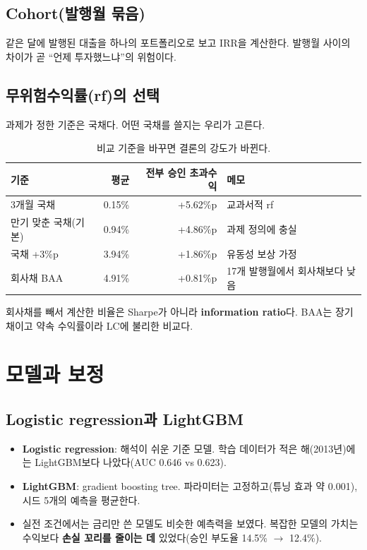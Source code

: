 \documentclass[11pt]{report}
\begin{document}
\section{Cohort(발행월 묶음)}
같은 달에 발행된 대출을 하나의 포트폴리오로 보고 IRR을 계산한다. 발행월 사이의 차이가 곧 ``언제 투자했느냐''의 위험이다.

\section{무위험수익률(rf)의 선택}
과제가 정한 기준은 국채다. 어떤 국채를 쓸지는 우리가 고른다.
\begin{table}[H]\centering\small
\begin{tabularx}{\linewidth}{@{}lrrL@{}}\toprule
기준 & 평균 & 전부 승인 초과수익 & 메모\\\midrule
3개월 국채 & 0.15\% & +5.62\%p & 교과서적 rf\\
만기 맞춘 국채(기본) & 0.94\% & +4.86\%p & 과제 정의에 충실\\
국채 +3\%p & 3.94\% & +1.86\%p & 유동성 보상 가정\\
회사채 BAA & 4.91\% & +0.81\%p & 17개 발행월에서 회사채보다 낮음\\\bottomrule
\end{tabularx}
\caption{비교 기준을 바꾸면 결론의 강도가 바뀐다.}
\end{table}
\begin{warnbox}
회사채를 빼서 계산한 비율은 Sharpe가 아니라 \textbf{information ratio}다. BAA는 장기채이고 약속 수익률이라 LC에 불리한 비교다.
\end{warnbox}

\chapter{모델과 보정}

\section{Logistic regression과 LightGBM}
\begin{itemize}
\item \textbf{Logistic regression}: 해석이 쉬운 기준 모델. 학습 데이터가 적은 해(2013년)에는 LightGBM보다 나았다(AUC 0.646 vs 0.623).
\item \textbf{LightGBM}: gradient boosting tree. 파라미터는 고정하고(튜닝 효과 약 0.001), 시드 5개의 예측을 평균한다.
\item 실전 조건에서는 금리만 쓴 모델도 비슷한 예측력을 보였다. 복잡한 모델의 가치는 수익보다 \textbf{손실 꼬리를 줄이는 데} 있었다(승인 부도율 14.5\% \ensuremath{\to} 12.4\%).
\end{itemize}
\end{document}
